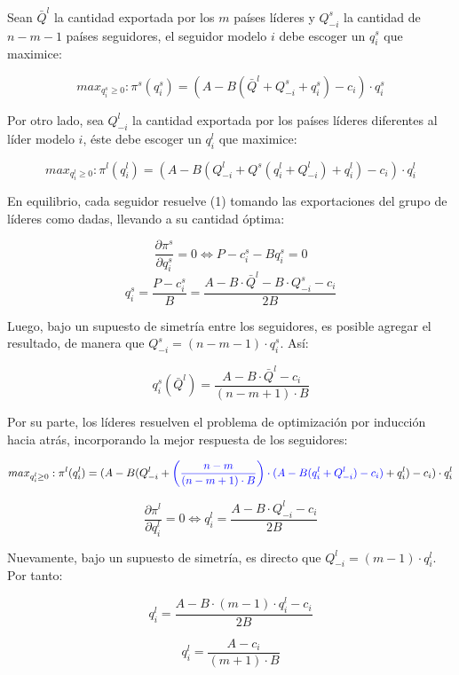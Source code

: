 Sean $\bar{Q}^{l}$ la cantidad exportada por los $m$ países líderes y $Q^{s}_{-i}$ la cantidad de $n-m-1$ países seguidores, el seguidor modelo $i$ debe escoger un $q^{s}_{i}$ que maximice:

\begin{equation}
    max_{q_{i}^{s} \ge 0}: \pi^{s}(q_{i}^{s}) = (A-B(\bar{Q}^{l}+Q^{s}_{-i} + q^{s}_{i})- c_{i})\cdot q_{i}^{s} 
\end{equation}

Por otro lado, sea $Q^{l}_{-i}$ la cantidad exportada por los países líderes diferentes al líder modelo $i$, éste debe escoger un $q^{l}_{i}$ que maximice:

$$ max_{q_{i}^{l} \ge 0}: \pi^{l}(q_{i}^{l}) = (A-B(Q^{l}_{-i}+Q^{s}(q^{l}_{i} + Q^{l}_{-i}) + q^{l}_{i})- c_{i})\cdot q_{i}^{l} $$

En equilibrio, cada seguidor resuelve (1) tomando las exportaciones del grupo de líderes como dadas, llevando a su cantidad óptima:

$$ \frac{\partial \pi^{s}}{\partial q_{i}^{s}} = 0 \iff P-c_{i}^{s}-B q_{i}^{s}=0$$
$$ q_{i}^{s}=\frac{P-c_{i}^{s}}{B} = \frac{A-B \cdot \bar{Q}^{l}-B\cdot Q^{s}_{-i}-c_{i}}{2B}$$

Luego, bajo un supuesto de simetría entre los seguidores, es posible agregar el resultado, de manera que $Q^{s}_{-i} = (n-m-1)\cdot q^{s}_{i}$. Así:

\begin{equation}
    q^{s}_{i}(\bar{Q}^{l}) = \frac{A-B\cdot \bar{Q}^{l}-c_{i}}{(n-m+1)\cdot B}
\end{equation}

Por su parte, los líderes resuelven el problema de optimización por inducción hacia atrás, incorporando la mejor respuesta de los seguidores:

$$  max_{q_{i}^{l} \ge 0}: \pi^{l}(q_{i}^{l}) = (A-B(Q^{l}_{-i}+ \textcolor{blue}{\left(\frac{n-m}{(n-m+1)\cdot B}\right)\cdot (A-B(q^{l}_{i}+Q^{l}_{-i})-c_{i})} + q^{l}_{i})- c_{i})\cdot q_{i}^{l} $$

$$ \frac{\partial \pi^{l}}{\partial q^{l}_{i}} = 0 \iff q^{l}_{i} = \frac{A-B\cdot Q^{l}_{-i} - c_{i}}{2B}$$

Nuevamente, bajo un supuesto de simetría, es directo que $Q^{l}_{-i} = (m-1)\cdot q^{l}_{i}$. Por tanto:

$$ q^{l}_{i} = \frac{A-B\cdot (m-1) \cdot q^{l}_{i} - c_{i}}{2B} $$

\begin{equation}
    q^{l}_{i} = \frac{A-c_{i}}{(m+1)\cdot B}    
\end{equation}

